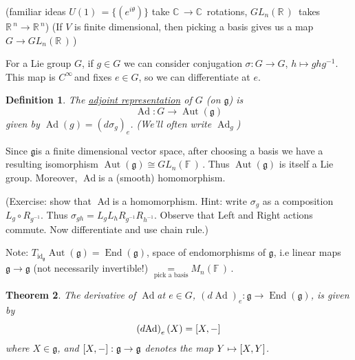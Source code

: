 \documentclass[12pt,a4paper]{article}
\newcommand{\rR}{\ensuremath{\mathbb{R}\,}}
\newcommand{\cC}{\ensuremath{\mathbb{C}\,}}
\newcommand{\fF}{\ensuremath{\mathbb{F}\,}}
\newcommand{\cinf}{\ensuremath{C^{\infty}\,}}
\newcommand{\tqn}[2]{\ensuremath{T_{#1} {#2}}}
\newcommand{\dg}[1]{\ensuremath{d {#1}}}
\newcommand{\mnf}{\ensuremath{M_n(\fF)\,}}
\newcommand{\glnr}{\ensuremath{GL_n(\rR)\,}}
\newcommand{\glnff}{\ensuremath{GL_n(\fF)\,}}
\newcommand{\guk}[1]{\ensuremath{U(#1)\,}}
\newcommand{\lalg}{\ensuremath{\mathfrak{g}}}
\newcommand{\ul}[1]{\underline{#1}}
\newcommand{\Ad}{\ensuremath{\operatorname{Ad}}}
\newcommand{\Adg}{\ensuremath{\operatorname{Ad}_g}}
\newtheorem{thm}{Theorem}[subsubsection]
\newtheorem{defn}[thm]{Definition}
\begin{document}
(familiar ideas $\guk{1}=\{(e^{i\theta})\}$ take $\cC\to \cC$ rotations, $\glnr$ takes $\rR^n\to \rR^n$)
(If $V$ is finite dimensional, then picking a basis gives us a map $G\to \glnr$)

For a Lie group $G$, if $g\in G$ we can consider conjugation $\sigma:G\to G$, $h\mapsto ghg^{-1}$. This map is \cinf and fixes $e\in G$, so we can differentiate at $e$.
\begin{defn}
The \ul{adjoint representation} of $G$ (on \lalg) is 
\[\Ad:G\to \operatorname{Aut}(\lalg)\]
given by $\Ad(g)=\left(\dg{\sigma_g}\right)_e$. (We'll often write $\Adg$)
\end{defn}
Since \lalg is a finite dimensional vector space, after choosing a basis we have a resulting isomorphism $\operatorname{Aut}(\lalg)\cong \glnff$. Thus $\operatorname{Aut}(\lalg)$ is itself a Lie group. Moreover, \Ad is a (smooth) homomorphism.

(Exercise: show that \Ad is a homomorphism. Hint: write $\sigma_g$ as a composition $L_g \circ R_{g^{-1}}$. Thus $\sigma_{gh}=L_g L_h R_{g^{-1}} R_{h^{-1}}$. Observe that Left and Right actions commute. Now differentiate and use chain rule.)

Note: $\tqn{\mathrm{id}_\lalg}{\operatorname{Aut}(\lalg)}=\operatorname{End}(\lalg)$, space of endomorphisms of \lalg, i.e linear maps $\lalg\to\lalg$ (not necessarily invertible!) $\underset{\text{pick a basis}}{=}\mnf$.

\begin{thm}
The derivative of \Ad at $e\in G$, $\left(\dg{\Ad}\right)_e:\lalg\to \operatorname{End}(\lalg)$, is given by 
\[\left(\dg{\Ad}\right)_e(X)=\comm{X}{-}\]
where $X\in \lalg$, and $\comm{X}{-}:\lalg\to \lalg$ denotes the map $Y\mapsto \comm{X}{Y}$.
\end{thm}
\end{document}
